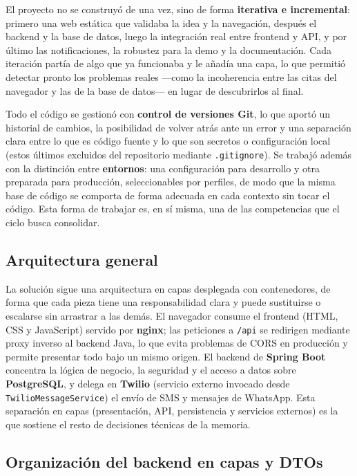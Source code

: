 \documentclass[12pt,a4paper]{report}
\begin{document}
El proyecto no se construyó de una vez, sino de forma \textbf{iterativa e incremental}: primero una web estática que validaba la idea y la navegación, después el backend y la base de datos, luego la integración real entre frontend y API, y por último las notificaciones, la robustez para la demo y la documentación. Cada iteración partía de algo que ya funcionaba y le añadía una capa, lo que permitió detectar pronto los problemas reales —como la incoherencia entre las citas del navegador y las de la base de datos— en lugar de descubrirlos al final.

Todo el código se gestionó con \textbf{control de versiones Git}, lo que aportó un historial de cambios, la posibilidad de volver atrás ante un error y una separación clara entre lo que es código fuente y lo que son secretos o configuración local (estos últimos excluidos del repositorio mediante \texttt{.gitignore}). Se trabajó además con la distinción entre \textbf{entornos}: una configuración para desarrollo y otra preparada para producción, seleccionables por perfiles, de modo que la misma base de código se comporta de forma adecuada en cada contexto sin tocar el código. Esta forma de trabajar es, en sí misma, una de las competencias que el ciclo busca consolidar.

\subsection{Arquitectura general}

La solución sigue una arquitectura en capas desplegada con contenedores, de forma que cada pieza tiene una responsabilidad clara y puede sustituirse o escalarse sin arrastrar a las demás. El navegador consume el frontend (HTML, CSS y JavaScript) servido por \textbf{nginx}; las peticiones a \texttt{/api} se redirigen mediante proxy inverso al backend Java, lo que evita problemas de CORS en producción y permite presentar todo bajo un mismo origen. El backend de \textbf{Spring Boot} concentra la lógica de negocio, la seguridad y el acceso a datos sobre \textbf{PostgreSQL}, y delega en \textbf{Twilio} (servicio externo invocado desde \texttt{TwilioMessageService}) el envío de SMS y mensajes de WhatsApp. Esta separación en capas (presentación, API, persistencia y servicios externos) es la que sostiene el resto de decisiones técnicas de la memoria.



\subsection{Organización del backend en capas y DTOs}
\end{document}
